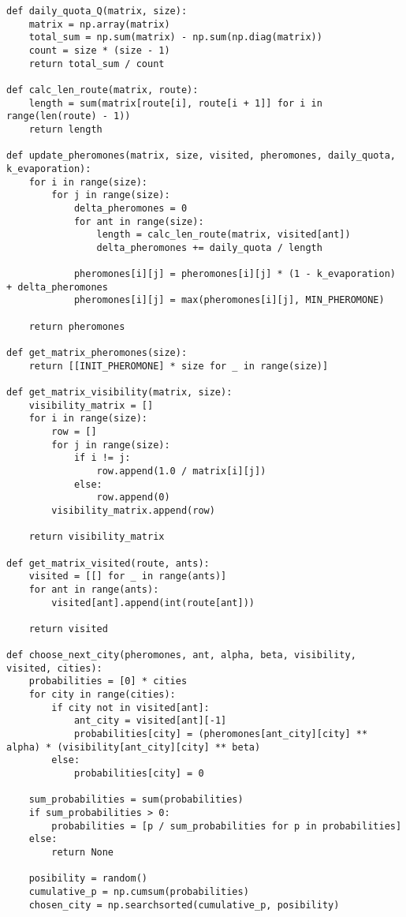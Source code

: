 \begin{center}
    \captionsetup{justification=raggedright,singlelinecheck=off}
    \begin{lstlisting}[label=lst:ant,caption=Муравьиный алгоритм]
def daily_quota_Q(matrix, size):
	matrix = np.array(matrix)
	total_sum = np.sum(matrix) - np.sum(np.diag(matrix))
	count = size * (size - 1)
	return total_sum / count

def calc_len_route(matrix, route):
	length = sum(matrix[route[i], route[i + 1]] for i in range(len(route) - 1))
	return length

def update_pheromones(matrix, size, visited, pheromones, daily_quota, k_evaporation):
	for i in range(size):
		for j in range(size):
			delta_pheromones = 0
			for ant in range(size):
				length = calc_len_route(matrix, visited[ant])
				delta_pheromones += daily_quota / length

			pheromones[i][j] = pheromones[i][j] * (1 - k_evaporation) + delta_pheromones
			pheromones[i][j] = max(pheromones[i][j], MIN_PHEROMONE)

	return pheromones

def get_matrix_pheromones(size):
	return [[INIT_PHEROMONE] * size for _ in range(size)]

def get_matrix_visibility(matrix, size):
	visibility_matrix = []
	for i in range(size):
		row = []
		for j in range(size):
			if i != j:
				row.append(1.0 / matrix[i][j])
			else:
				row.append(0)
		visibility_matrix.append(row)

	return visibility_matrix

def get_matrix_visited(route, ants):
	visited = [[] for _ in range(ants)]
	for ant in range(ants):
		visited[ant].append(int(route[ant]))

	return visited

def choose_next_city(pheromones, ant, alpha, beta, visibility, visited, cities):
	probabilities = [0] * cities
	for city in range(cities):
		if city not in visited[ant]:
			ant_city = visited[ant][-1]
			probabilities[city] = (pheromones[ant_city][city] ** alpha) * (visibility[ant_city][city] ** beta)
		else:
			probabilities[city] = 0

	sum_probabilities = sum(probabilities)
	if sum_probabilities > 0:
		probabilities = [p / sum_probabilities for p in probabilities]
	else:
		return None

	posibility = random()
	cumulative_p = np.cumsum(probabilities)
	chosen_city = np.searchsorted(cumulative_p, posibility)
	

\end{lstlisting}
\end{center}
